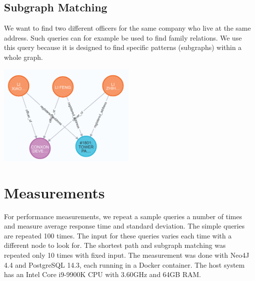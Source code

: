 \documentclass[11pt, a4paper,oneside,chapterprefix=false]{scrbook}
\begin{document}
\subsection{Subgraph Matching}

We want to find two different officers for the same company who live at the same address.
Such queries can for example be used to find family relations.
We use this query because it is designed to find specific patterns (subgraphs) within a whole graph.

\begin{center}
\includegraphics*[width=0.5\textwidth]{figures/query_relation.png}
\end{center}



%
%


\section{Measurements} \label{sec:measurements}

For performance measurements, we repeat a sample queries a number of times and measure average response time and standard deviation.
The simple queries are repeated 100 times.
The input for these queries varies each time with a different node to look for.
The shortest path and subgraph matching was repeated only 10 times with fixed input.
The measurement was done with Neo4J 4.4 and PostgreSQL 14.3, each running in a Docker container.
The host system has an Intel Core i9-9900K CPU with 3.60GHz and 64GB RAM.
\end{document}
